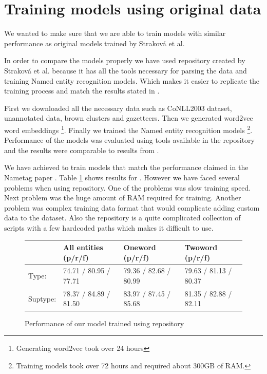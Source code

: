\documentclass[thesis=B,english]{FITthesis}[2012/10/20]
\begin{document}
\section{Training models using original data}
We wanted to make sure that we are able to train models with similar performance as original models trained by Strakov{\' a} et al.

\par In order to compare the models properly we have used repository \cite{repoStrakovaNER} created by Strakov{\' a} et al. because it has all the tools necessary for parsing the data and training Named entity recognition models. Which makes it easier to replicate the training process and match the results stated in \cite{stateOfTheArtCzechNER}.

\par First we downloaded all the necessary data such as CoNLL2003 dataset, unannotated data, brown clusters and gazetteers. Then we generated word2vec \cite{word2vec} word embeddings \footnote{Generating word2vec took over 24 hours}. Finally we trained the Named entity recognition models \footnote{Training models took over 72 hours and required about 300GB of RAM.}. Performance of the models was evaluated using tools available in the repository and the results \label{repo_results} were comparable to results from \cite{stateOfTheArtCzechNER}.
\par We have achieved to train models that match the performance claimed in the Nametag paper \cite{stateOfTheArtCzechNER}. Table \ref{table_repo} shows results for . However we have faced several problems when using \cite{repoStrakovaNER} repository. One of the problems was slow training speed. Next problem was the huge amount of RAM required for training. Another problem was complex training data format that would complicate adding custom data to the dataset. Also the repository is a quite complicated collection of scripts with a few hardcoded paths which makes it difficult to use.

\begin{figure}[!ht]
\centering
\caption[Performance of our model trained using \cite{repoStrakovaNER} repository]{Performance of our model trained using \cite{repoStrakovaNER} repository \protect\footnotemark }
\label{table_repo}
\begin{tabular}{|l|l|l|l|}
\hline
         & All entities (p/r/f)  & Oneword (p/r/f)       & Twoword (p/r/f)       \\ \hline \hline
Type:    & 74.71 / 80.95 / 77.71 & 79.36 / 82.68 / 80.99 & 79.63 / 81.13 / 80.37 \\ \hline
Suptype: & 78.37 / 84.89 / 81.50 & 83.97 / 87.45 / 85.68 & 81.35 / 82.88 / 82.11 \\ \hline
\end{tabular}
\end{figure}
\end{document}
